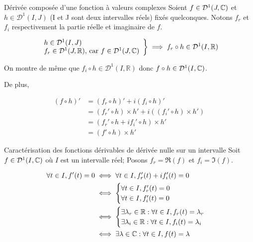 \documentclass{article}
\renewenvironment{question_kholle}[2][ ]
{
	\subsection{\texorpdfstring{#2}{}}
	\notblank{#1}
	{
		\noindent #1
		\bigbreak
	}
	{}
	\begin{proof}
}
{
	\end{proof}
}
\begin{document}
\begin{question_kholle}{Dérivée composée d'une fonction à valeurs complexes}
	Soient $f \in \mathcal D ^1(J, \mathbb C) $ et $h \in \mathcal D^1(I, J)$ (I et J sont deux intervalles réels) fixés quelconques. Notons $f_r$ et $f_i$ respectivement la partie réelle et imaginaire de $f$.
	
	\begin{align*}
		\left .
		\begin{array}{ll}
			h \in \mathcal D^1(I, J) \\
			f_r \in \mathcal D^1(J, \mathbb R) \text{, car } f \in \mathcal D^1(J, \mathbb C)
		\end{array}
		\right \}
		\implies f_r \circ h \in \mathcal D^1(I, \mathbb R)
	\end{align*}
	
	On montre de même que $f_i \circ h \in \mathcal D^1(I, \mathbb  R)$ donc $f \circ h \in \mathcal D^1(I, \mathbb C)$.
	
	De plus,
	
	\begin{align*}
		(f \circ h)' &= (f_r \circ h)' + i (f_i \circ h)' \\
		&= (f_r' \circ h ) \times h' + i((f_i' \circ h) \times h') \\
		&=(f_r' \circ h + if_i' \circ h) \times h' \\
		&= (f' \circ h) \times h'
	\end{align*}
\end{question_kholle}

\begin{question_kholle}{Caractérisation des fonctions dérivables de dérivée nulle sur un intervalle}
	Soit $f \in \mathcal D ^1 (I, \mathbb C)$ où $I$ est un intervalle réel;
	Posons $f_r = \Re (f)$ et $f_i = \Im(f)$.
	
	\begin{align*}
	\forall t \in I, f'(t) = 0 &\iff \forall t \in I, f_r'(t) + i f_i'(t) = 0 \\
	&\iff \begin{cases}
		\forall t \in I, f_r'(t) = 0 \\
		\forall t \in I, f_i'(t) = 0
	\end{cases} \\
	&\iff \begin{cases}
		\exists \lambda_r \in \mathbb R : \forall t \in I,  f_r(t) = \lambda_r \\
			\exists \lambda_i \in \mathbb R : \forall t \in I,  f_i(t) = \lambda_i
	\end{cases} \\
	&\iff \exists \lambda \in \mathbb C : \forall t \in I,  f(t) = \lambda
	\end{align*}
\end{question_kholle}
\end{document}
